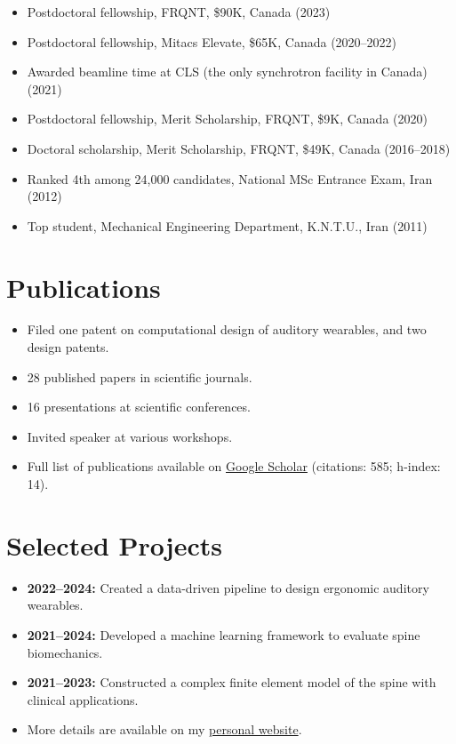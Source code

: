 \documentclass[11pt,a4paper]{article}
\begin{document}
\begin{itemize}[leftmargin=*, label={}]
    \item Postdoctoral fellowship, FRQNT, \$90K, Canada (2023)
    \item Postdoctoral fellowship, Mitacs Elevate, \$65K, Canada (2020--2022)
    \item Awarded beamline time at CLS (the only synchrotron facility in Canada) (2021)
    \item Postdoctoral fellowship, Merit Scholarship, FRQNT, \$9K, Canada (2020)
    \item Doctoral scholarship, Merit Scholarship, FRQNT, \$49K, Canada (2016--2018)
    \item Ranked 4th among 24,000 candidates, National MSc Entrance Exam, Iran (2012)
    \item Top student, Mechanical Engineering Department, K.N.T.U., Iran (2011)
\end{itemize}

\section*{Publications}

\begin{itemize}[leftmargin=*, label={}]
    \item Filed one patent on computational design of auditory wearables, and two design patents.
    \item 28 published papers in scientific journals.
    \item 16 presentations at scientific conferences.
    \item Invited speaker at various workshops.
    \item Full list of publications available on \href{https://scholar.google.com/citations?user=Ryg1OQgAAAAJ&hl=en}{Google Scholar} (citations: 585; h-index: 14).
\end{itemize}

\section*{Selected Projects}

\begin{itemize}[leftmargin=*, label={}]
    \item \textbf{2022--2024:} Created a data-driven pipeline to design ergonomic auditory wearables.
    \item \textbf{2021--2024:} Developed a machine learning framework to evaluate spine biomechanics.
    \item \textbf{2021--2023:} Constructed a complex finite element model of the spine with clinical applications.
    \item More details are available on my \href{https://sites.google.com/view/farshidghezelbash/home}{personal website}.
\end{itemize}
\end{document}
